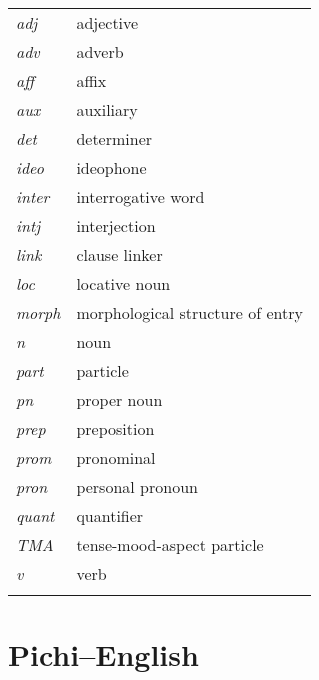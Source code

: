 \begin{multicols}{2}

\begin{tabularx}{\textwidth}{XX}
\lsptoprule
\itshape adj & adjective\\
\itshape adv & adverb\\
\itshape aff & affix\\
\itshape aux & auxiliary\\
\itshape det & determiner\\
\itshape ideo & ideophone\\
\itshape inter & interrogative word\\
\itshape intj & interjection\\
\itshape link & clause linker\\
\itshape loc & locative noun\\
\itshape morph & morphological structure of entry\\
\itshape n & noun\\
\itshape part & particle\\
\itshape pn & proper noun\\
\itshape prep & preposition\\
\itshape prom & pronominal\\
\itshape pron & personal pronoun\\
\itshape quant & quantifier\\
\itshape TMA & tense-mood-aspect particle\\
\itshape v & verb\\
\lspbottomrule
\end{tabularx}
\end{multicols}

\sloppy
\section{Pichi–English}
